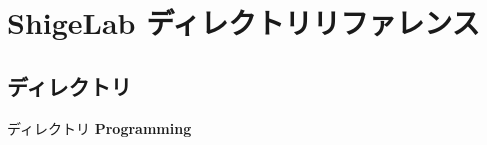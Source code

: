 \section{Shige\-Lab ディレクトリリファレンス}
\label{dir_a0d9d77de56eed61b71feb2adefbb47d}
\subsection*{ディレクトリ}
\begin{DoxyCompactItemize}
\item 
ディレクトリ {\bf Programming}
\end{DoxyCompactItemize}
